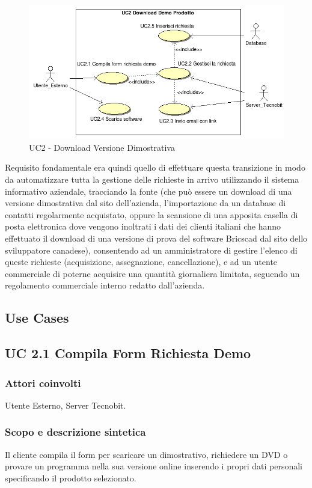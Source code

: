 \begin{figure}[!ht]
\centering
 \includegraphics[scale=0.7]{./images/UC2_download.png}
\caption{UC2 - Download Versione Dimostrativa}
\end{figure}

\noindent
Requisito fondamentale era quindi quello di effettuare questa transizione in modo da automatizzare tutta la gestione delle richieste in arrivo utilizzando il sistema informativo aziendale, tracciando la fonte (che pu\`o essere un download di una versione dimostrativa dal sito dell'azienda, l'importazione da un database di contatti regolarmente acquistato, oppure la scansione di una apposita casella di posta elettronica dove vengono inoltrati i dati dei clienti italiani che hanno effettuato il download di una versione di prova del software Bricscad dal sito dello sviluppatore canadese), consentendo ad un amministratore di gestire l'elenco di queste richieste (acquisizione, assegnazione, cancellazione), e ad un utente commerciale di poterne acquisire una quantit\`a giornaliera limitata, seguendo un regolamento commerciale interno redatto dall'azienda.
\subsection{Use Cases}

\subsection*{UC 2.1 Compila Form Richiesta Demo}
\subsubsection*{Attori coinvolti} Utente Esterno, Server Tecnobit.
\subsubsection*{Scopo e descrizione sintetica}
Il cliente compila il form per scaricare un dimostrativo, richiedere un DVD o provare un programma nella sua versione online inserendo i propri dati personali specificando il prodotto selezionato.
